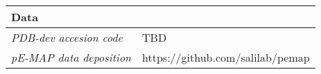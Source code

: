 \documentclass[8pt,a4paper]{article}
\begin{document}
\begin{longtable}{ p{} | p{} }
  \textbf{Data} & \\
    \hline
            \textit{PDB-dev accesion code} & TBD\\
                  \textit{pE-MAP data deposition} & https://github.com/salilab/pemap\\
          \hline
  
\end{longtable}
\end{document}
